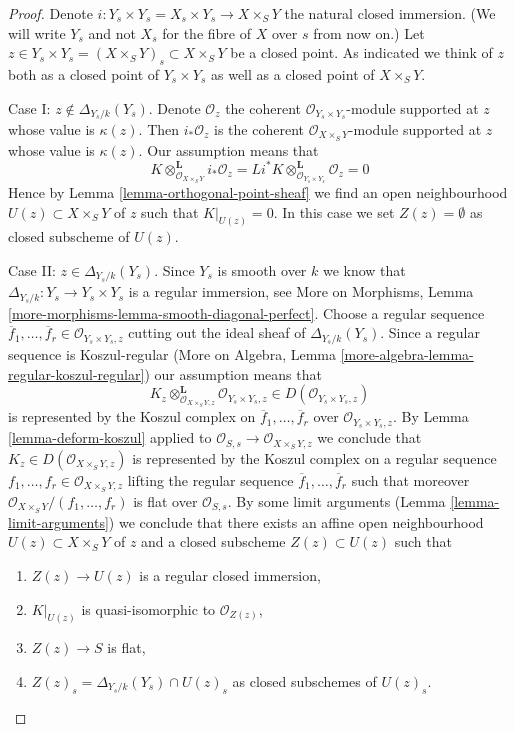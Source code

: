 \documentclass{stacks-project}
\theoremstyle{plain}
\theoremstyle{definition}
\theoremstyle{remark}
\numberwithin{equation}{subsection}
\begin{document}
\begin{proof}
Denote $i : Y_s \times Y_s = X_s \times Y_s \to X \times_S Y$
the natural closed immersion. (We will write $Y_s$ and not $X_s$
for the fibre of $X$ over $s$ from now on.) Let
$z \in Y_s \times Y_s = (X \times_S Y)_s \subset X \times_S Y$
be a closed point. As indicated we think of $z$ both as a closed point
of $Y_s \times Y_s$ as well as a closed point of $X \times_S Y$.

\medskip\noindent
Case I: $z \not \in \Delta_{Y_s/k}(Y_s)$. Denote $\mathcal{O}_z$
the coherent $\mathcal{O}_{Y_s \times Y_s}$-module supported at $z$
whose value is $\kappa(z)$. Then $i_*\mathcal{O}_z$ is the
coherent $\mathcal{O}_{X \times_S Y}$-module supported at $z$
whose value is $\kappa(z)$. Our assumption means that
$$
K \otimes_{\mathcal{O}_{X \times_S Y}}^\mathbf{L} i_*\mathcal{O}_z =
Li^*K \otimes_{\mathcal{O}_{Y_s \times Y_s}}^\mathbf{L} \mathcal{O}_z = 0
$$
Hence by Lemma \ref{lemma-orthogonal-point-sheaf}
we find an open neighbourhood $U(z) \subset X \times_S Y$ of $z$
such that $K|_{U(z)} = 0$. In this case we set $Z(z) = \emptyset$
as closed subscheme of $U(z)$.

\medskip\noindent
Case II: $z \in \Delta_{Y_s/k}(Y_s)$. Since $Y_s$ is smooth over $k$
we know that $\Delta_{Y_s/k} : Y_s \to Y_s \times Y_s$ is a
regular immersion, see More on Morphisms, Lemma
\ref{more-morphisms-lemma-smooth-diagonal-perfect}.
Choose a regular sequence $\overline{f}_1, \ldots, \overline{f}_r \in
\mathcal{O}_{Y_s \times Y_s, z}$ cutting out the ideal sheaf of
$\Delta_{Y_s/k}(Y_s)$. Since a regular sequence is Koszul-regular
(More on Algebra, Lemma \ref{more-algebra-lemma-regular-koszul-regular})
our assumption means that
$$
K_z \otimes_{\mathcal{O}_{X \times_S Y, z}}^\mathbf{L}
\mathcal{O}_{Y_s \times Y_s, z}
\in D(\mathcal{O}_{Y_s \times Y_s, z})
$$
is represented by the Koszul complex on
$\overline{f}_1, \ldots, \overline{f}_r$ over
$\mathcal{O}_{Y_s \times Y_s, z}$.
By Lemma \ref{lemma-deform-koszul} applied to
$\mathcal{O}_{S, s} \to \mathcal{O}_{X \times_S Y, z}$
we conclude that $K_z \in D(\mathcal{O}_{X \times_S Y, z})$ is
represented by the Koszul complex on a regular sequence
$f_1, \ldots, f_r \in \mathcal{O}_{X \times_S Y, z}$
lifting the regular sequence
$\overline{f}_1, \ldots, \overline{f}_r$
such that moreover $\mathcal{O}_{X \times_S Y}/(f_1, \ldots, f_r)$
is flat over $\mathcal{O}_{S, s}$.
By some limit arguments (Lemma \ref{lemma-limit-arguments})
we conclude that there exists an affine open neighbourhood
$U(z) \subset X \times_S Y$ of $z$ and a closed subscheme
$Z(z) \subset U(z)$ such that
\begin{enumerate}
\item $Z(z) \to U(z)$ is a regular closed immersion,
\item $K|_{U(z)}$ is quasi-isomorphic to $\mathcal{O}_{Z(z)}$,
\item $Z(z) \to S$ is flat,
\item $Z(z)_s = \Delta_{Y_s/k}(Y_s) \cap U(z)_s$
as closed subschemes of $U(z)_s$.
\end{enumerate}


\end{proof}
\end{document}
